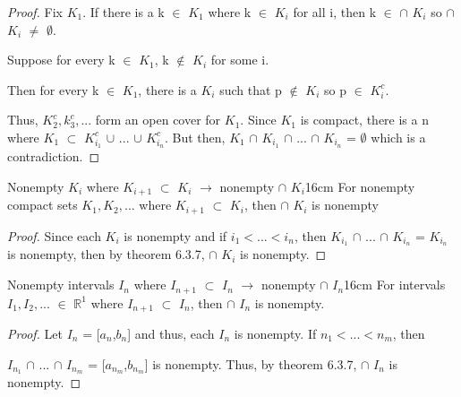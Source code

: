 	\begin{proof}
		Fix $K_1$.
		If there is a k $\in$ $K_1$ where k $\in$ $K_i$ for all i, then
		k $\in$ $\cap$ $K_i$ so $\cap$ $K_i$ $\not =$ $\emptyset$.

		Suppose for every k $\in$ $K_1$, k $\not \in$ $K_i$ for some i.

		Then for every k $\in$ $K_1$, there is a $K_i$ such that
		p $\not \in$ $K_i$ so p $\in$ $K_i^c$.

		Thus, $K_2^c, k_3^c, ...$ form an open cover for $K_1$.
		Since $K_1$ is compact, there is a n where
		$K_1$ $\subset$ $K_{i_1}^c$ $\cup$ ... $\cup$ $K_{i_n}^c$.
		But then, $K_1$ $\cap$ $K_{i_1}$ $\cap$ ... $\cap$ $K_{i_n}$
		= $\emptyset$ which is a contradiction.
	\end{proof}

	\vspace{0.5cm}



	\begin{corollary}{Nonempty $K_i$ where $K_{i+1}$ $\subset$ $K_i$
	$\rightarrow$ nonempty $\cap$ $K_i$}{16cm}
		For nonempty compact sets $K_1, K_2, ...$ where $K_{i+1}$ $\subset$ $K_i$,
		then $\cap$ $K_i$ is nonempty 
	\end{corollary}
	
	\begin{proof}
		Since each $K_i$ is nonempty and if $i_1 < ... < i_n$, then
		$K_{i_1}$ $\cap$ ... $\cap$ $K_{i_n}$
		= $K_{i_n}$ is nonempty, then
		by {\color{red} theorem 6.3.7}, $\cap$ $K_i$ is nonempty.
	\end{proof}

	\vspace{0.5cm}




	\begin{wtheorem}{Nonempty intervals $I_n$ where
	$I_{n+1}$ $\subset$ $I_n$ $\rightarrow$ nonempty $\cap$ $I_n$}{16cm}
		For intervals $I_1, I_2, ...$ $\in$ $\mathbb{R}^1$
		where $I_{n+1}$ $\subset$ $I_n$,
		then $\cap$ $I_n$ is nonempty.
	\end{wtheorem}
	
	\begin{proof}
		Let $I_n$ = [$a_n$,$b_n$] and thus, each $I_n$ is nonempty.
		If $n_1 < ... < n_m$, then

		$I_{n_1}$ $\cap$ ... $\cap$ $I_{n_m}$
		= [$a_{n_m}$,$b_{n_m}$] is nonempty.
		Thus, by {\color{red} theorem 6.3.7}, $\cap$ $I_n$ is nonempty.	
	\end{proof}

